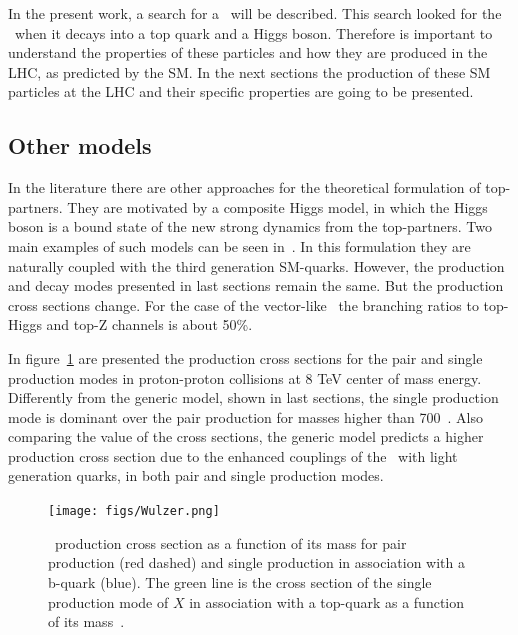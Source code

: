 In the present work, a search for a \Tp~will be described. This search looked for the \Tp~when it decays into a top quark and a Higgs boson. Therefore is important to understand the properties of these particles and how they are produced in the LHC, as predicted by the SM. In the next sections the production of these SM particles at the LHC and their specific properties are going to be presented. %

\subsection{Other models}
\label{sec:OModels}

In the literature there are other approaches for the theoretical formulation of top-partners. They are motivated by a composite Higgs model, in which the Higgs boson is a bound state of the new strong dynamics from the top-partners. Two main examples of such models can be seen in~\cite{DeSimone:2012fs,Matsedonskyi:2012ym}. In this formulation they are naturally coupled with the third generation SM-quarks. However, the production and decay modes presented in last sections remain the same. But the production cross sections change. For the case of the vector-like \Tp~the branching ratios to top-Higgs and top-Z channels is about 50\%.

In figure~\ref{fig:OMXS} are presented the production cross sections for the pair and single production modes in proton-proton collisions at 8 TeV center of mass energy. Differently from the generic model, shown in last sections, the single production mode is dominant over the pair production for masses higher than 700~\GeVcc. Also comparing the value of the cross sections, the generic model predicts a higher production cross section due to the enhanced couplings of the \Tp~with light generation quarks, in both pair and single production modes.

\begin{figure}[!Hhtbp]
  \begin{center}
    \texttt{[image: figs/Wulzer.png]}
    \caption{\Tp~production cross section as a function of its mass for pair production (red dashed) and single production in association with a b-quark (blue). The green line is the cross section of the single production mode of $X$ in association with a top-quark as a function of its mass~\cite{DeSimone:2012fs}.}
    \label{fig:OMXS}
  \end{center}
\end{figure}


